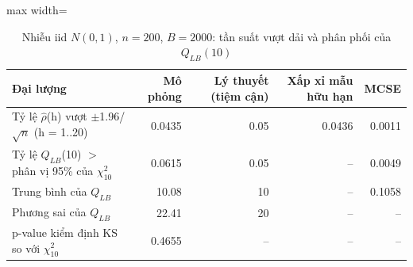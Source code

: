 \begin{table}[H]
\centering\footnotesize
\caption{Nhiễu iid $N(0,1)$, $n=200$, $B=2000$: tần suất vượt dải và phân phối của $Q_{LB}(10)$}\label{tab:tab_b11_04_simulation}
\begin{adjustbox}{max width=\linewidth}
\begin{tabular}{|>{\raggedright\arraybackslash}p{}|r|r|r|r|}
\toprule
Đại lượng & Mô phỏng & Lý thuyết (tiệm cận) & Xấp xỉ mẫu hữu hạn & MCSE \\
\midrule
Tỷ lệ \textbar{}$\hat{\rho}$(h)\textbar{} vượt $\pm$1.96/$\sqrt{n}$ (h = 1..20) & 0.0435 & 0.05 & 0.0436 & 0.0011 \\[3pt]
Tỷ lệ $Q_{LB}$(10) $>$ phân vị 95\% của $\chi^{2}_{10}$ & 0.0615 & 0.05 & – & 0.0049 \\[3pt]
Trung bình của $Q_{LB}$ & 10.08 & 10 & – & 0.1058 \\[3pt]
Phương sai của $Q_{LB}$ & 22.41 & 20 & – & – \\[3pt]
p-value kiểm định KS so với $\chi^{2}_{10}$ & 0.4655 & – & – & – \\[3pt]
\bottomrule
\end{tabular}
\end{adjustbox}\par{}
\end{table}
